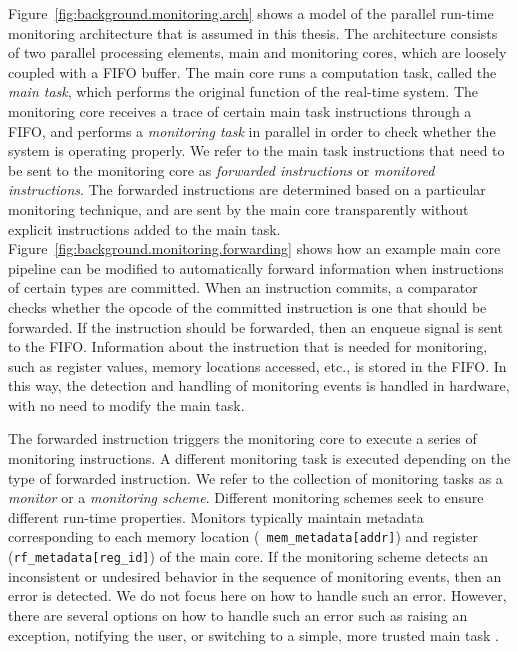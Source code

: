 Figure~\ref{fig:background.monitoring.arch} shows a model of the
parallel run-time monitoring architecture that is assumed in this thesis. The
architecture consists of two parallel processing elements, main and monitoring
cores, which are loosely coupled with a FIFO buffer.  The main core runs a
computation task, called the {\em main task}, which performs the original
function of the real-time system.  The monitoring core receives a trace of
certain main task instructions through a FIFO, and performs a {\em monitoring
task} in parallel in order to check whether the system is operating properly.
We refer to the main task instructions that need to be sent to the monitoring
core as {\em forwarded instructions} or {\em monitored instructions}. The
forwarded instructions are determined based on a particular monitoring
technique, and are sent by the main core transparently without explicit
instructions added to the main task.
Figure~\ref{fig:background.monitoring.forwarding} shows how an example
main core pipeline can be modified to automatically forward information when
instructions of certain types are committed. When an instruction commits, a
comparator checks whether the opcode of the committed instruction is one that
should be forwarded. If the instruction should be forwarded, then an enqueue
signal is sent to the FIFO.  Information about the instruction that is needed
for monitoring, such as register values, memory locations accessed, etc., is
stored in the FIFO. In this way, the detection and handling of monitoring
events is handled in hardware, with no need to modify the main task.

The forwarded instruction triggers the monitoring core to execute a series of
monitoring instructions.  A different monitoring task is executed depending on
the type of forwarded instruction. We refer to the collection of monitoring
tasks as a \emph{monitor} or a \emph{monitoring scheme}. Different monitoring
schemes seek to ensure different run-time properties.  Monitors typically
maintain metadata corresponding to each memory location ({\tt
mem\_metadata[addr]}) and register ({\tt rf\_metadata[reg\_id]}) of the main
core.  If the monitoring scheme detects an inconsistent or undesired behavior
in the sequence of monitoring events, then an error is detected. We do not
focus here on how to handle such an error. However, there are several options
on how to handle such an error such as raising an exception, notifying the
user, or switching to a simple, more trusted main task \cite{sha-simplex-sw01}.

